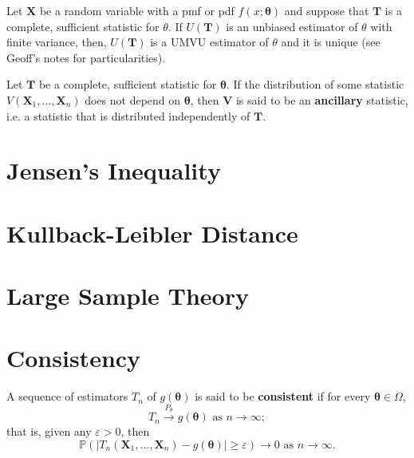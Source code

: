 \begin{theorem}[Theorem 2]\label{thm:thm 2 UMVU}
    Let \(\bm{X}\) be a random variable with a pmf or pdf \(f(x;\bm{\theta})\) and suppose that \(\bm{T}\) is a complete, sufficient statistic for \(\theta\). 
    If \(U(\bm{T})\) is an unbiased estimator of \(\theta\) with finite variance, 
    then, \(U(\bm{T})\) is a UMVU estimator of \(\theta\) and it is unique (see Geoff's notes for particularities).
\end{theorem}

\begin{theorem}\label{thm:Basu's}
    Let \(\bm{T}\) be a complete, sufficient statistic for \(\bm{\theta}\). 
    If the distribution of some statistic \(V(\bm{X}_1,...,\bm{X}_n)\) does not depend on \(\bm{\theta}\), 
    then \(\bm{V}\) is said to be an \textbf{ancillary} statistic, i.e. a statistic that is distributed independently of \(\bm{T}\).
\end{theorem}


\section{Jensen's Inequality}\label{sec:Jensen's ineq}



\section{Kullback-Leibler Distance}\label{sec:Kullback-Leibler}



\section{Large Sample Theory}\label{sec:large sample theory}


\section{Consistency}\label{sec:consistency}

\begin{definition}[Consistent]\label{defn:consistent}
    A sequence of estimators \(T_n\) of \(g(\bm{\theta})\) is said to be \textbf{consistent} if for every \(\bm{\theta}\in\Omega\), 
    \begin{equation*}
        T_n \overset{P_\theta}{\to} g(\bm{\theta})\text{ as } n\to\infty;
    \end{equation*}
    that is, given any \(\varepsilon>0\), then 
    \begin{equation*}
        \mathbb{P}\left(|T_n(\bm{X}_1,...,\bm{X}_n) - g(\bm{\theta})| \geq \varepsilon \right) \to 0\text{ as } n\to\infty.
    \end{equation*}
\end{definition}

